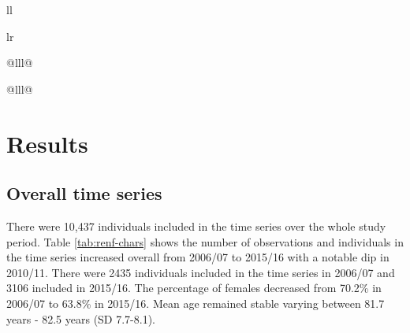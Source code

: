 \documentclass[12pt,a4paper,oneside,table]{report}
\begin{document}
\begin{tabular}[t]{ll}
\begin{tabular}{lr}
{\begin{tabular}{@{}lll@{}}
\begin{tabular}{@{}lll@{}}
\FloatBarrier
\section{Results}\label{sec:renf-results}

\subsection{Overall time series}\label{subsec:renf-res-ts}

\begin{table}[h]
\centering
{}
\caption{Characteristics of observations in time series}
\label{tab:renf-chars}
\end{table}

There were 10,437 individuals included in the time series over the whole
study period. Table \ref{tab:renf-chars} shows the number of
observations and individuals in the time series increased overall from
2006/07 to 2015/16 with a notable dip in 2010/11. There were 2435
individuals included in the time series in 2006/07 and 3106 included in
2015/16. The percentage of females decreased from 70.2\% in 2006/07 to
63.8\% in 2015/16. Mean age remained stable varying between 81.7 years -
82.5 years (SD 7.7-8.1).


\end{tabular}
\end{tabular}}
\end{tabular}
\end{tabular}
\end{document}
